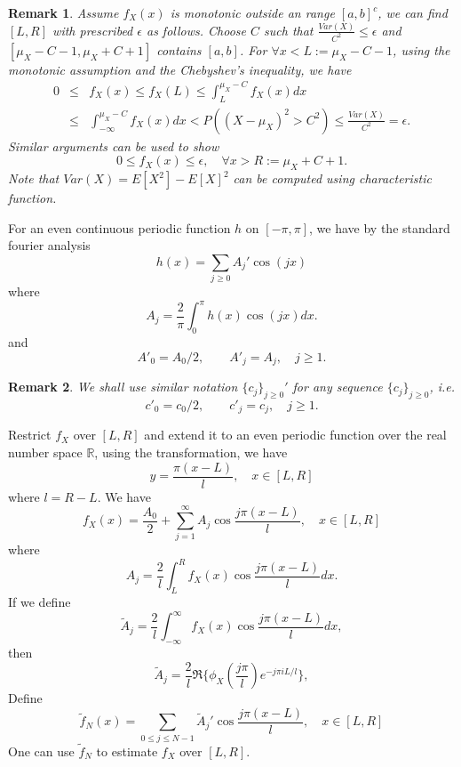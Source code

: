 \documentclass[numreferences]{kluwer}    %
\newtheorem{Rem}{Remark}
\begin{document}
\begin{article}
\begin{Rem}
Assume $f_X(x)$ is monotonic outside an range $[a,b]^c$, we can find
$[L,R]$ with prescribed $\epsilon$ as follows. Choose $C$ such that
$\frac{Var(X)}{C^2}\le \epsilon$ and $[\mu_X-C-1, \mu_X+C+1]$
contains $[a,b]$. For $\forall x<L:=\mu_X-C-1$, using the monotonic assumption
and the Chebyshev's inequality, we have
\begin{eqnarray*}
0&\le& f_X(x)\le f_X(L)\le \int^{\mu_X-C}_{L}f_X(x)dx\\
&\le& \int^{\mu_X-C}_{-\infty}f_X(x)dx <P((X-\mu_X)^2>C^2)\le
\frac{Var(X)}{C^2}=\epsilon.
\end{eqnarray*}
Similar arguments can be used to show
\[
0\le f_X(x)\le \epsilon, \quad \forall x>R:=\mu_X+C+1.
\]
Note that
$Var(X)=E[X^2]-E[X]^2$ can be computed using characteristic
function.
\end{Rem}
For an even continuous periodic function $h$ on $[-\pi,\pi]$, we
have by the standard fourier analysis
\[
h(x)={\sum_{j \ge 0}}A_j' \cos(jx)
\]
where
\begin{equation}\label{Aj1}
A_j=\frac{2}{\pi}\int^{\pi}_0 h(x)\cos(jx)dx.
\end{equation}
and
\begin{equation}\label{Ajp}
A'_0=A_0/2,\quad  \quad A'_j=A_j,\quad j\ge 1.
\end{equation}
\begin{Rem}
We shall use similar notation $\{c_j\}_{j\ge 0}'$ for any
sequence $\{c_j\}_{j\ge 0}$, i.e.
\begin{equation}\label{cjp}
c'_0=c_0/2,\quad  \quad c'_j=c_j,\quad j\ge 1.
\end{equation}
\end{Rem}
Restrict $f_X$ over $[L,R]$ and
extend it to an even periodic function over the real number space
$\mathbb{R}$, using the transformation, we have
\begin{equation}\label{y}
y=\frac{\pi(x-L)}l,\quad x\in [L,R]
\end{equation}
where $l=R-L$. We have
\[
f_X(x)=\frac{A_0}2+\sum_{j=1}^{\infty}A_j \cos\frac{j\pi(x-L)}l,
\quad x\in [L,R]
\]
where
\begin{equation}\label{Aj2}
A_j=\frac{2}l\int^{R}_L f_X(x)\cos\frac{j\pi(x-L)}l dx.
\end{equation}
If we define
\[
\tilde A_j=\frac{2}l\int^{\infty}_{-\infty}
f_X(x)\cos\frac{j\pi(x-L)}ldx,
\]
then
\begin{equation}\label{Ajt}
\tilde A_j=\frac{2}l \Re\{\phi_X(\frac{j\pi}l) e^{-j\pi i L/l}\},
\end{equation}
Define
\begin{equation}\label{pdfa}
\tilde f_{N}(x)={\sum_{0\le j\le N-1}}\tilde{A}_j'
\cos\frac{j\pi(x-L)}l, \quad x\in [L,R]
\end{equation}
One can use $\tilde f_N$ to estimate $f_X$ over $[L,R]$.

\end{article}
\end{document}
